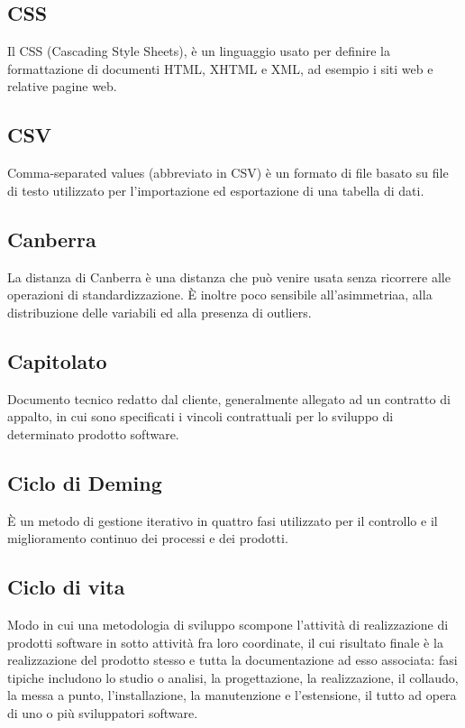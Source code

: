 \documentclass[../glossario.tex]{subfiles}
\begin{document}
\subsection*{CSS}
{}
Il CSS (Cascading Style Sheets), è un linguaggio usato per definire la formattazione di documenti HTML, XHTML e XML, ad esempio i siti web e relative pagine web.

\subsection*{CSV}
{}
Comma-separated values (abbreviato in CSV) è un formato di file basato su file di testo utilizzato per l'importazione ed esportazione di una tabella di dati.

\subsection*{Canberra}
{}
La distanza di Canberra è una distanza che può venire usata senza ricorrere alle operazioni di standardizzazione. È inoltre poco sensibile all'asimmetriaa, alla distribuzione delle variabili ed alla presenza di outliers.

\subsection*{Capitolato}
{}
Documento tecnico redatto dal cliente, generalmente allegato ad un contratto di appalto, in cui sono specificati i vincoli contrattuali per lo sviluppo di determinato prodotto software.


\subsection*{Ciclo di Deming}
{}
È un metodo di gestione iterativo in quattro fasi utilizzato per il controllo e il miglioramento continuo dei processi e dei prodotti.


\subsection*{Ciclo di vita}
{}
Modo in cui una metodologia di sviluppo scompone l'attività di realizzazione di prodotti software in sotto attività fra loro coordinate, il cui risultato finale è la realizzazione del prodotto stesso e tutta la documentazione ad esso associata: fasi tipiche includono lo studio o analisi, la progettazione, la realizzazione, il collaudo, la messa a punto, l'installazione, la manutenzione e l'estensione, il tutto ad opera di uno o più sviluppatori software.
\end{document}
